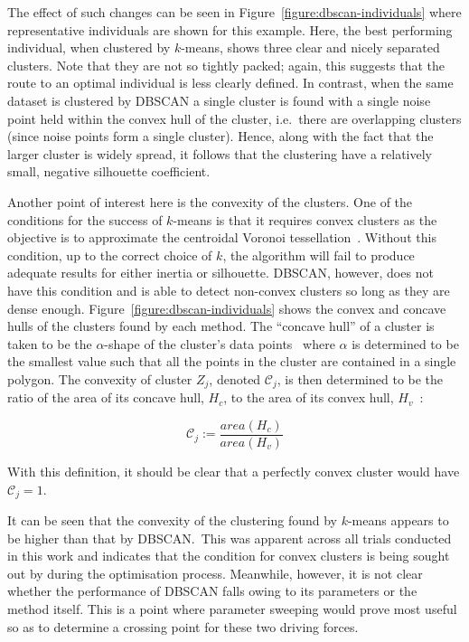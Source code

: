 The effect of such changes can be seen in Figure~\ref{figure:dbscan-individuals}
where representative individuals are shown for this example. Here, the best
performing individual, when clustered by \(k\)-means, shows three clear and
nicely separated clusters. Note that they are not so tightly packed; again, this
suggests that the route to an optimal individual is less clearly defined. In
contrast, when the same dataset is clustered by DBSCAN a single cluster is found
with a single noise point held within the convex hull of the cluster, i.e.\
there are overlapping clusters (since noise points form a single cluster).
Hence, along with the fact that the larger cluster is widely spread, it follows
that the clustering have a relatively small, negative silhouette coefficient.

Another point of interest here is the convexity of the clusters. One of the
conditions for the success of \(k\)-means is that it requires convex clusters as
the objective is to approximate the centroidal Voronoi
tessellation~\cite{Du2006}. Without this condition, up to the correct choice of
\(k\), the algorithm will fail to produce adequate results for either inertia or
silhouette. DBSCAN, however, does not have this condition and is able to detect
non-convex clusters so long as they are dense enough.
Figure~\ref{figure:dbscan-individuals} shows the convex and concave hulls of the
clusters found by each method. The ``concave hull'' of a cluster is taken to be
the \(\alpha\)-shape of the cluster's data points~\cite{Edelsbrunner1983} where
\(\alpha\) is determined to be the smallest value such that all the points in
the cluster are contained in a single polygon. The convexity of cluster \(Z_j\),
denoted \(\mathcal{C}_j\), is then determined to be the ratio of the area of its
concave hull, \(H_c\), to the area of its convex hull, \(H_v\)~\cite{Sonka1993}:

\begin{equation}
    \mathcal{C}_j := \frac{area(H_c)}{area(H_v)}
\end{equation}

With this definition, it should be clear that a perfectly convex cluster would
have \(\mathcal{C}_j = 1\).

It can be seen that the convexity of the clustering found by \(k\)-means appears
to be higher than that by DBSCAN.\ This was apparent across all trials conducted
in this work and indicates that the condition for convex clusters is being
sought out by during the optimisation process. Meanwhile, however, it is not
clear whether the performance of DBSCAN falls owing to its parameters or the
method itself. This is a point where parameter sweeping would prove most useful
so as to determine a crossing point for these two driving forces.

